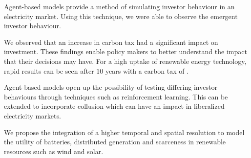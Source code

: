 
Agent-based models provide a method of simulating investor behaviour in an electricity market. Using this technique, we were able to observe the emergent investor behaviour. 

We observed that an increase in carbon tax had a significant impact on investment. These findings enable policy makers to better understand the impact that their decisions may have. For a high uptake of renewable energy technology, rapid results can be seen after 10 years with a carbon tax of .

Agent-based models open up the possibility of testing differing investor behaviours through techniques such as reinforcement learning. This can be extended to incorporate collusion which can have an impact in liberalized electricity markets\cite{Benjamin2016}.

We propose the integration of a higher temporal and spatial resolution to model the utility of batteries, distributed generation and scarceness in renewable resources such as wind and solar.


\FloatBarrier